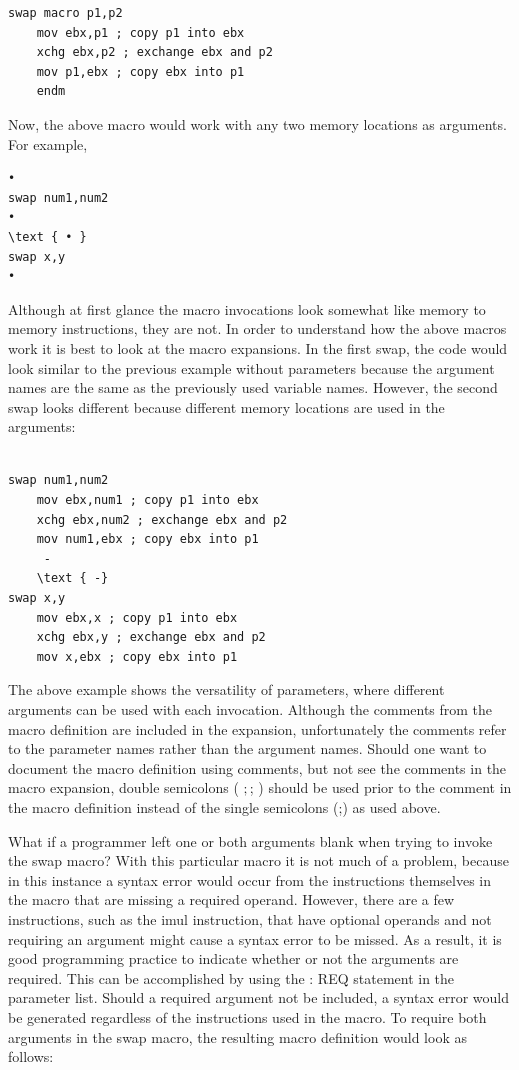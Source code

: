 \documentclass[10pt]{book}
\begin{document}
\begin{verbatim}
swap macro p1,p2
    mov ebx,p1 ; copy p1 into ebx
    xchg ebx,p2 ; exchange ebx and p2
    mov p1,ebx ; copy ebx into p1
    endm
\end{verbatim}

Now, the above macro would work with any two memory locations as arguments. For example,

\begin{verbatim}
•
swap num1,num2
•
\text { • }
swap x,y
•
\end{verbatim}

Although at first glance the macro invocations look somewhat like memory to memory instructions, they are not. In order to understand how the above macros work it is best to look at the macro expansions. In the first swap, the code would look similar to the previous example without parameters because the argument\\
names are the same as the previously used variable names. However, the second swap looks different because different memory locations are used in the arguments:


\begin{verbatim}
     
swap num1,num2
    mov ebx,num1 ; copy p1 into ebx
    xchg ebx,num2 ; exchange ebx and p2
    mov num1,ebx ; copy ebx into p1
     -
    \text { -}
swap x,y
    mov ebx,x ; copy p1 into ebx
    xchg ebx,y ; exchange ebx and p2
    mov x,ebx ; copy ebx into p1
\end{verbatim}

The above example shows the versatility of parameters, where different arguments can be used with each invocation. Although the comments from the macro definition are included in the expansion, unfortunately the comments refer to the parameter names rather than the argument names. Should one want to document the macro definition using comments, but not see the comments in the macro expansion, double semicolons ( $;$; ) should be used prior to the comment in the macro definition instead of the single semicolons (;) as used above.

What if a programmer left one or both arguments blank when trying to invoke the swap macro? With this particular macro it is not much of a problem, because in this instance a syntax error would occur from the instructions themselves in the macro that are missing a required operand. However, there are a few instructions, such as the imul instruction, that have optional operands and not requiring an argument might cause a syntax error to be missed. As a result, it is good programming practice to indicate whether or not the arguments are required. This can be accomplished by using the : REQ statement in the parameter list. Should a required argument not be included, a syntax error would be generated regardless of the instructions used in the macro. To require both arguments in the swap macro, the resulting macro definition would look as follows:
\end{document}
